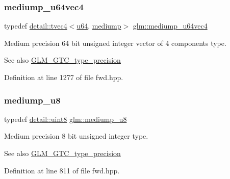 \subsubsection{\texorpdfstring{mediump\+\_\+u64vec4}{mediump\_u64vec4}}
{\footnotesize\ttfamily typedef \hyperlink{structglm_1_1detail_1_1tvec4}{detail\+::tvec4}$<$\hyperlink{group__gtc__type__precision_ga71cedd4972f9cb1a5e14dfe5ab83ecd7}{u64}, \hyperlink{namespaceglm_a0f04f086094c747d227af4425893f545a6416f3ea0c9025fb21ed50c4d6620482}{mediump}$>$ \hyperlink{group__gtc__type__precision_gae25a6609fa377ba1ec983ec32a91f1d4}{glm\+::mediump\+\_\+u64vec4}}

Medium precision 64 bit unsigned integer vector of 4 components type. \begin{DoxySeeAlso}{See also}
\hyperlink{group__gtc__type__precision}{G\+L\+M\+\_\+\+G\+T\+C\+\_\+type\+\_\+precision} 
\end{DoxySeeAlso}


Definition at line 1277 of file fwd.\+hpp.

\mbox{\label{group__gtc__type__precision_gac04b372784392e82bd557f300c4de097}} 
\subsubsection{\texorpdfstring{mediump\+\_\+u8}{mediump\_u8}}
{\footnotesize\ttfamily typedef \hyperlink{namespaceglm_1_1detail_aef2588f97d090cc19fbbe0c74fe17c8f}{detail\+::uint8} \hyperlink{group__gtc__type__precision_gac04b372784392e82bd557f300c4de097}{glm\+::mediump\+\_\+u8}}

Medium precision 8 bit unsigned integer type. \begin{DoxySeeAlso}{See also}
\hyperlink{group__gtc__type__precision}{G\+L\+M\+\_\+\+G\+T\+C\+\_\+type\+\_\+precision} 
\end{DoxySeeAlso}


Definition at line 811 of file fwd.\+hpp.

\mbox{\label{group__gtc__type__precision_gadefca284b7a5980fb6be735abb77395e}} 
